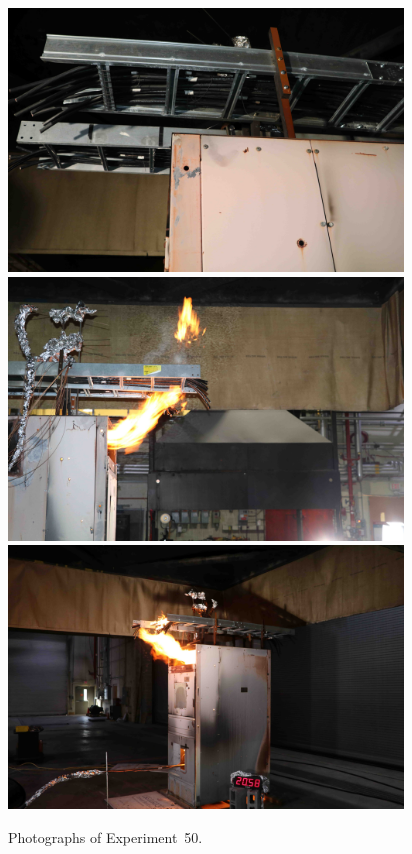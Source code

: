 \begin{figure}[p]
\centering
\includegraphics[height=2.75in]{../FIGURES/Test_50_cables} \\
\includegraphics[height=2.75in]{../FIGURES/Test_50_side} \\
\includegraphics[height=2.75in]{../FIGURES/Test_50_20_min_58_s}
\caption[Photographs of Experiment~50]{Photographs of Experiment~50.}
\label{fig:Test_50_photos}
\end{figure}


\clearpage


